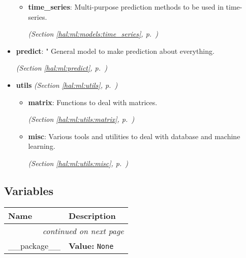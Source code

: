 \begin{itemize}
\begin{itemize}
    \item \textbf{time\_series}: Multi-purpose prediction methods to be used in time-series. 


  \textit{(Section \ref{hal:ml:models:time_series}, p.~\pageref{hal:ml:models:time_series})}

  \end{itemize}
\item \textbf{predict}: " General model to make prediction about everything. 


  \textit{(Section \ref{hal:ml:predict}, p.~\pageref{hal:ml:predict})}

\item \textbf{utils}
  \textit{(Section \ref{hal:ml:utils}, p.~\pageref{hal:ml:utils})}

  \begin{itemize}
\setlength{\parskip}{0ex}
    \item \textbf{matrix}: Functions to deal with matrices. 


  \textit{(Section \ref{hal:ml:utils:matrix}, p.~\pageref{hal:ml:utils:matrix})}

    \item \textbf{misc}: Various tools and utilities to deal with database and machine learning. 


  \textit{(Section \ref{hal:ml:utils:misc}, p.~\pageref{hal:ml:utils:misc})}

  \end{itemize}
\end{itemize}



  \subsection{Variables}

    \vspace{-1cm}
\hspace{\varindent}\begin{longtable}{|p{\varnamewidth}|p{\vardescrwidth}|l}
\cline{1-2}
\cline{1-2} \centering \textbf{Name} & \centering \textbf{Description}& \\
\cline{1-2}
\endhead\cline{1-2}\multicolumn{3}{r}{\small\textit{continued on next page}}\\\endfoot\cline{1-2}
\endlastfoot\raggedright \_\-\_\-p\-a\-c\-k\-a\-g\-e\-\_\-\_\- & \raggedright \textbf{Value:} 
{\tt None}&\\
\cline{1-2}
\end{longtable}


